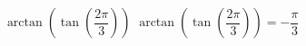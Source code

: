  {$\arctan\left(\tan\left(\dfrac{2\pi}{3}\right) \right)$}
{ $\arctan\left(\tan\left(\dfrac{2\pi}{3}\right) \right) = -\dfrac{\pi}{3}$}
